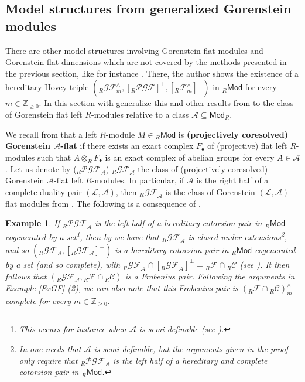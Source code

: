 \documentclass[10pt,reqno]{amsart}
\numberwithin{equation}{section}
\newtheorem{example}[definition]{Example}
\theoremstyle{remark}
\newcommand{\A}{\mathcal{A}}
\begin{document}

\subsection*{Model structures from generalized Gorenstein modules}

There are other model structures involving Gorenstein flat modules and Gorenstein flat dimensions which are not covered by the methods presented in the previous section, like for instance \cite[Thm. B]{Rachid}. There, the author shows the existence of a hereditary Hovey triple $({}_R\mathcal{GF}^\wedge_m, [{}_R\mathcal{PGF}]^\perp, [{}_R\mathcal{F}^\wedge_m]^\perp)$ in ${}_R\mathsf{Mod}$ for every $m \in \mathbb{Z}_{\geq 0}$. In this section with generalize this and other results from \cite{Rachid} to the class of Gorenstein flat left $R$-modules relative to a class $\mathcal{A} \subseteq \mathsf{Mod}_R$. 

We recall from \cite[Def. 2.1]{EstradaMarco} that a left $R$-module $M \in {}_R\mathsf{Mod}$ is \textbf{(projectively coresolved) Gorenstein $\bm{\mathcal{A}}$-flat} if there exists an exact complex $F_\bullet$ of (projective) flat left $R$-modules such that $A \otimes_R F_\bullet$ is an exact complex of abelian groups for every $A \in \mathcal{A}$. Let us denote by (${}_R\mathcal{PGF}_{\mathcal{A}}$) ${}_R\mathcal{GF}_{\mathcal{A}}$ the class of (projectively coresolved) Gorenstein $\A$-flat left $R$-modules. In particular, if $\A$ is the right half of a complete duality pair $(\mathcal{L,A})$, then ${}_R\mathcal{GF}_{\mathcal{A}}$ is the class of Gorenstein $(\mathcal{L,A})$-flat modules from \cite[Def. 5.1]{Gillespie-DP}. The following is a consequence of \cite{EstradaMarco}.


\begin{example}\label{ex:FP-Gflat-relative}
If ${}_R\mathcal{PGF}_{\mathcal{A}}$ is the left half of a hereditary cotorsion pair in ${}_R\mathsf{Mod}$ cogenerated by a set\footnote{This occurs for instance when $\A$ is \emph{semi-definable} (see \cite[Def. 2.7]{EstradaMarco}).}, then by \cite[Thm. 2.14]{EstradaMarco} we have that ${}_R\mathcal{GF}_{\mathcal{A}}$ is closed under extensions\footnote{In \cite[Thm. 2.14]{EstradaMarco} one needs that $\A$ is semi-definable, but the arguments given in the proof only require that ${}_R\mathcal{PGF}_{\A}$ is the left half of a hereditary and complete cotorsion pair in ${}_R\mathsf{Mod}$.}, and so $({}_R\mathcal{GF}_{\mathcal{A}},[{}_R\mathcal{GF}_{\mathcal{A}}]^\perp)$ is a hereditary cotorsion pair in ${}_R\mathsf{Mod}$ cogenerated by a set (and so complete), with ${}_R\mathcal{GF}_{\mathcal{A}} \cap [{}_R\mathcal{GF}_{\mathcal{A}}]^\perp = {}_R\mathcal{F} \cap {}_R\mathcal{C}$ (see \cite[Coroll. 2.20 \& Prop. 3.1]{EstradaMarco}). It then follows that $({}_R\mathcal{GF}_{\mathcal{A}},{}_R\mathcal{F} \cap {}_R\mathcal{C})$ is a Frobenius pair. Following the arguments in Example \ref{ExGF} (2), we can also note that this Frobenius pair is $({}_R\mathcal{F} \cap {}_R\mathcal{C})^\wedge_m$-complete for every $m \in \mathbb{Z}_{\geq 0}$. 
\end{example}
\end{document}
